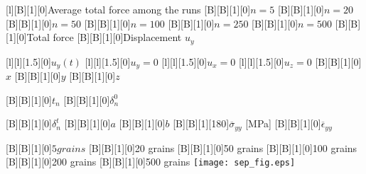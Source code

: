 \documentclass[border=12pt, crop]{standalone}
\begin{document}
  
  
      [l][B][1][0]{Average total force among the runs}
      [B][B][1][0]{$n = 5$}
      [B][B][1][0]{$n = 20$}
      [B][B][1][0]{$n = 50$}
      [B][B][1][0]{$n = 100$}
      [B][B][1][0]{$n = 250$}
      [B][B][1][0]{$n = 500$}
      [B][B][1][0]{Total force}
      [B][B][1][0]{Displacement $u_y$}
            
      [l][l][1.5][0]{$u_y(t)$}
      [l][l][1.5][0]{$u_y = 0$}
      [l][l][1.5][0]{$u_x = 0$}
      [l][l][1.5][0]{$u_z = 0$}
 [B][B][1][0]{$x$}
  [B][B][1][0]{$y$}  
  [B][B][1][0]{$z$}
  
    [B][B][1][0]{$t_n$}
        [B][B][1][0]{$\delta_n^0$}

    [B][B][1][0]{$\delta_n^t$}
    [B][B][1][0]{$a$}
    [B][B][1][0]{$b$}
     [B][B][1][180]{$\overline{\sigma}_{yy}$ [MPa]}
   [B][B][1][0]{$\overline{\epsilon}_{yy}$}

   [B][B][1][0]{$5 grains$}
 [B][B][1][0]{20 grains}
  [B][B][1][0]{50 grains}
   [B][B][1][0]{100 grains}
    [B][B][1][0]{200 grains}
    [B][B][1][0]{500 grains}
      \texttt{[image: sep\_fig.eps]}

    
\end{document}
